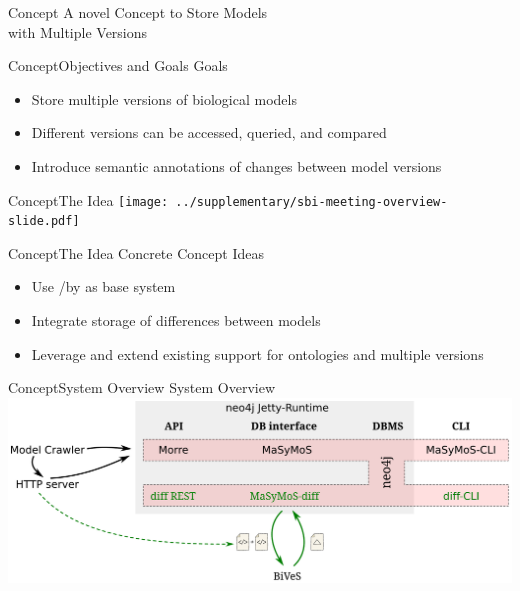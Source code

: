 \begin{frame}{Concept}{}
	\centering
	\LARGE A novel Concept to Store Models\\ with Multiple Versions
\end{frame}

\begin{frame}{Concept}{Objectives and Goals}
	{\LARGE Goals}
	\\[2.5em]
	\large
	\begin{itemize}
		\item Store multiple versions of biological models
		\item Different versions can be accessed, queried, and compared
		\item Introduce semantic annotations of changes between model versions
	\end{itemize}
\end{frame}

\begin{frame}{Concept}{The Idea}
	\centering
	\texttt{[image: ../supplementary/sbi-meeting-overview-slide.pdf]}
\end{frame}

\begin{frame}{Concept}{The Idea}
	{\Large Concrete Concept Ideas}
	\\[2.5em]
	\begin{itemize}
		\item Use \neoj/\masymos by \citeauthor{Henkel2015} as base system
		\item Integrate storage of differences between models
		\item Leverage and extend existing support for ontologies and multiple versions
	\end{itemize}
\end{frame}

\begin{frame}{Concept}{System Overview}
	{\LARGE System Overview}
	\\[2.5em]
	\centering
	\vfill
	\includegraphics[width=\linewidth,height=\textheight,keepaspectratio]{../tex/resources/system-overview-matrix.pdf}
	\vfill
\end{frame}

